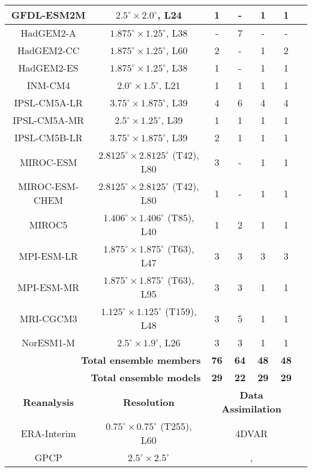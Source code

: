\begin{table}
\begin{tabular}{ccccccc}
    GFDL-ESM2M & $2.5^{\circ}\times2.0^{\circ}$, L24 & 1 & - & 1 & 1 \\ \hline
    HadGEM2-A & $1.875^{\circ}\times1.25^{\circ}$, L38 & - & 7 & - & - \\
    HadGEM2-CC & $1.875^{\circ}\times1.25^{\circ}$, L60 & 2 & - & 1 & 2 \\
    HadGEM2-ES & $1.875^{\circ}\times1.25^{\circ}$, L38 & 1 & - & 1 & 1 \\ \hline
    INM-CM4 & $2.0^{\circ}\times1.5^{\circ}$, L21 & 1 & 1 & 1 & 1 \\ \hline
    IPSL-CM5A-LR & $3.75^{\circ}\times1.875^{\circ}$, L39 & 4 & 6 & 4 & 4 \\
    IPSL-CM5A-MR & $2.5^{\circ}\times1.25^{\circ}$, L39 & 1 & 1 & 1 & 1 \\
    IPSL-CM5B-LR & $3.75^{\circ}\times1.875^{\circ}$, L39 & 2 & 1 & 1 & 1 \\ \hline
    MIROC-ESM & $2.8125^{\circ}\times2.8125^{\circ}$ (T42), L80 & 3 & - & 1 & 1 \\
    MIROC-ESM-CHEM & $2.8125^{\circ}\times2.8125^{\circ}$ (T42), L80 & 1 & - & 1 & 1 \\
    MIROC5 & $1.406^{\circ}\times1.406^{\circ}$ (T85), L40 & 1 & 2 & 1 & 1 \\ \hline
    MPI-ESM-LR & $1.875^{\circ}\times1.875^{\circ}$ (T63), L47 & 3 & 3 & 3 & 3 \\
    MPI-ESM-MR & $1.875^{\circ}\times1.875^{\circ}$ (T63), L95 & 3 & 3 & 1 & 1 \\ \hline
    MRI-CGCM3 & $1.125^{\circ}\times1.125^{\circ}$ (T159), L48 & 3 & 5 & 1 & 1 \\ \hline
    NorESM1-M & $2.5^{\circ}\times1.9^{\circ}$, L26 & 3 & 3 & 1 & 1 \\ \hline \hline
    \multicolumn{2}{r}{\textbf{Total ensemble members}} & \textbf{76} & \textbf{64} & \textbf{48} & \textbf{48} \\
    \multicolumn{2}{r}{\textbf{Total ensemble models}} & \textbf{29} & \textbf{22} & \textbf{29} & \textbf{29} \\ \hline \hline
    \textbf{Reanalysis} & \textbf{Resolution} & \multicolumn{4}{c}{\textbf{Data Assimilation}} \\ \hline
    ERA-Interim & $0.75^{\circ}\times0.75^{\circ}$ (T255), L60 & \multicolumn{4}{c}{4DVAR} \\
    GPCP & $2.5^{\circ}\times2.5^{\circ}$ & \multicolumn{4}{c}{\footnotesize{\cite{Adler2003}, \cite{Huffman2009}}} \\
    \hline \hline
  \end{tabular}
\end{table}


